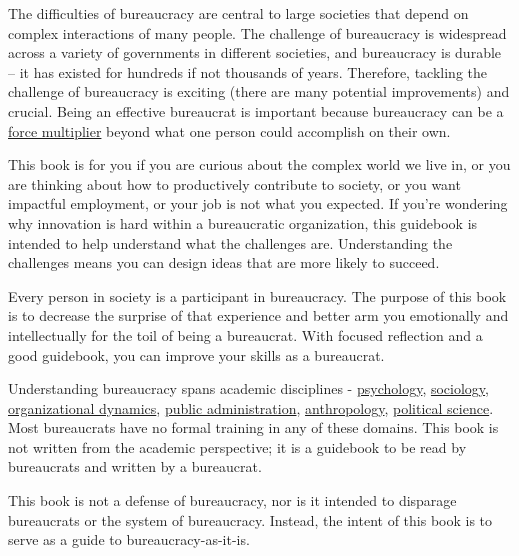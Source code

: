 The difficulties of bureaucracy are central  to large societies that depend on complex interactions of many people. The challenge of bureaucracy is widespread across a variety of governments in different societies, and bureaucracy is durable -- it has existed for hundreds if not thousands of years. Therefore, tackling the challenge of bureaucracy is exciting (there are many potential improvements) and crucial. 
Being an effective bureaucrat is important because bureaucracy can be a \href{https://en.wikipedia.org/wiki/Force_multiplication}{force multiplier} beyond what one person could accomplish on their own.


This book is for you if you are curious about the complex world we live in, or you are thinking about how to productively contribute to society, or you want impactful employment, or your job is not what you expected. If you're wondering why innovation is hard within a bureaucratic organization, this guidebook is intended to help understand what the challenges are. Understanding the challenges means you can design ideas that are more likely to succeed.


Every person in society is a participant in bureaucracy. The purpose of this book is to decrease the surprise of that experience and better arm you emotionally and intellectually for the toil of being a bureaucrat. With focused reflection and a good guidebook, you can improve your skills as a bureaucrat. 

Understanding bureaucracy spans academic disciplines - \href{https://en.wikipedia.org/wiki/Psychology}{psychology}, \href{https://en.wikipedia.org/wiki/Sociology}{sociology}, \href{https://en.wikipedia.org/wiki/Organizational_behavior}{organizational dynamics}, \href{https://en.wikipedia.org/wiki/Public_administration}{public administration}, \href{https://en.wikipedia.org/wiki/Anthropology}{anthropology}, \href{https://en.wikipedia.org/wiki/Political_science}{political science}. Most bureaucrats have no formal training in any of these domains. This book is not written from the academic perspective; it is a guidebook to be read by bureaucrats and written by a bureaucrat. 

This book is not a defense of bureaucracy, nor is it intended to disparage bureaucrats or the system of bureaucracy. Instead, the intent of this book is to serve as a guide to bureaucracy-as-it-is. 

